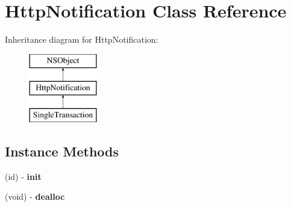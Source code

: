 \hypertarget{interface_http_notification}{}\section{Http\+Notification Class Reference}
\label{interface_http_notification}
Inheritance diagram for Http\+Notification\+:\begin{figure}[H]
\begin{center}
\leavevmode
\includegraphics[height=3.000000cm]{interface_http_notification}
\end{center}
\end{figure}
\subsection*{Instance Methods}
\begin{DoxyCompactItemize}
\item 
\mbox{\label{interface_http_notification_a19afbd02c594100357d5fba77f15171c}} 
(id) -\/ {\bfseries init}
\item 
\mbox{\label{interface_http_notification_a1988f3ada0558d7b2c61723675694382}} 
(void) -\/ {\bfseries dealloc}
\end{DoxyCompactItemize}
